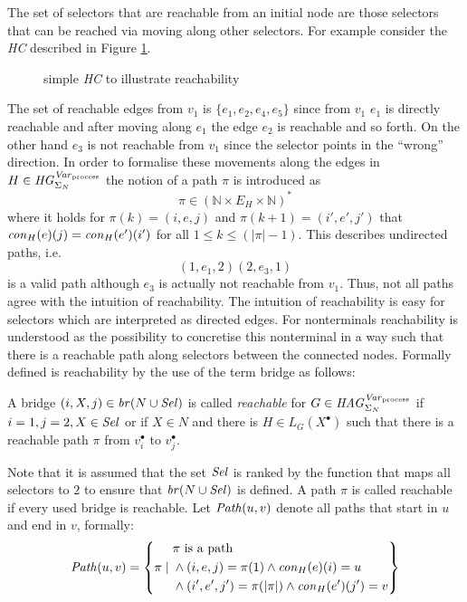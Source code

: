 	The set of selectors that are reachable from an initial node are those
	selectors that can be reached via moving along other selectors. For example
	consider the \emph{\ac{HC}} described in Figure \ref{fig:reachability}.
	\begin{figure}[h]
		\begin{center}
			
		\end{center}
		\caption{simple \emph{\ac{HC}} to illustrate reachability}
		\label{fig:reachability}
	\end{figure}
	The set of reachable edges from $v_{1}$ is $\{e_{1}, e_{2}, e_{4}, e_{5}\}$
	since from $v_{1}$ $e_{1}$ is directly reachable and after moving along
	$e_{1}$ the edge $e_{2}$ is reachable and so forth. On the other hand
	$e_{3}$ is not reachable from $v_{1}$ since the selector points in the
	\enquote{wrong} direction. In order to formalise these movements along the
	edges in $H\in\mathit{HG}_{\Sigma_{N}}^{\mathit{Var}_{\text{process}}}$ the notion of a path $\pi$ is introduced as
	\begin{equation*}
		\pi \in (\mathbb{N}\times E_{H}\times \mathbb{N})^{\ast}
	\end{equation*}
	where it holds for $\pi(k) = (i,e,j)$ and $\pi(k+1) = (i',e',j')$ that
	$\mathit{con}_{H}(e)(j) = \mathit{con}_{H}(e')(i')$ for all $1\leq k \leq (|\pi| - 1)$. This
	describes undirected paths, i.e.
	\begin{equation*}
		(1, e_{1}, 2)(2, e_{3}, 1)
	\end{equation*}
	is a valid path although $e_{3}$ is actually not reachable from $v_{1}$.
	Thus, not all paths agree with the intuition of reachability. The intuition
	of reachability is easy for selectors which are interpreted as directed
	edges. For nonterminals reachability is understood as the possibility to
	concretise this nonterminal in a way such that there is a reachable path
	along selectors between the connected nodes. Formally defined is
	reachability by the use of the term bridge as follows:
	\begin{definition}[Reachability]
		A bridge $(i, X, j) \in \mathit{br}(N\cup\mathit{Sel})$ is called \emph{reachable}
		for $G\in\mathit{HAG}_{\Sigma_{N}}^{\mathit{Var}_{\text{process}}}$ if $i = 1, j = 2, X\in\mathit{Sel}$ or if $X\in N$ and there is
		$H\in L_G(X^{\bullet})$ such that there is a reachable path $\pi$ from
		$v_i^{\bullet}$ to $v_j^{\bullet}$.
	\end{definition}
	Note that it is assumed that the set $\mathit{Sel}$ is ranked by the function that
	maps all selectors to $2$ to ensure that $\mathit{br}(N\cup \mathit{Sel})$ is defined. A
	path $\pi$ is called reachable if every used bridge is reachable. Let
	$\mathit{Path}(u,v)$ denote all paths that start in $u$ and end in $v$, formally:
	\begin{equation*}
		\mathit{Path}(u,v) = \left\{\pi\mid
			\begin{aligned}
					&\pi\text{ is a path}\\
					&\land(i,e,j) =\pi(1)\land\mathit{con}_{H}(e)(i)=u\\
					&\land(i',e',j') =\pi(|\pi|)\land\mathit{con}_{H}(e')(j') = v
			\end{aligned}
		\right\}
	\end{equation*}

